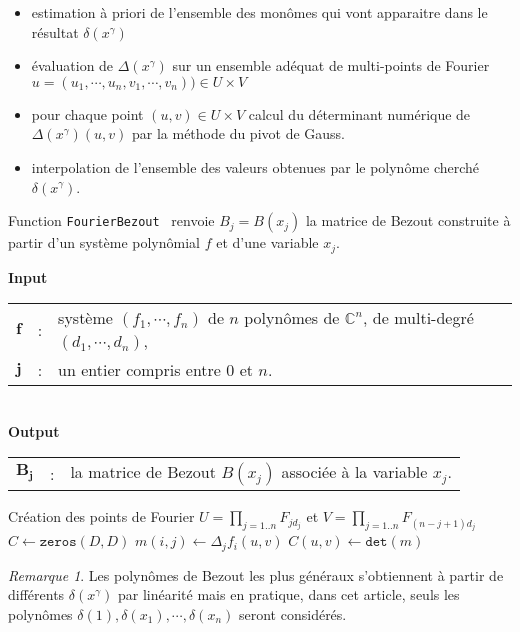 \documentclass{article}
\theoremstyle{plain}%
\theoremstyle{definition}
\theoremstyle{remark}
\newtheorem*{rem}{Remarque}
\newcommand{\vecb}[1]{\pmb{#1}}
\newcommand{\C}{\mathbb{C}}
\begin{document}
\begin{itemize}
\item estimation à priori de l'ensemble des monômes qui vont apparaitre dans le résultat $\delta(x^\gamma)$
\item évaluation de $\Delta(x^\gamma)$ sur un ensemble adéquat de multi-points de Fourier $u = (u_1,\cdots, u_n, v_1,\cdots, v_n) ) \in U\times V$
\item pour chaque point $(u, v) \in U\times V$ calcul du déterminant numérique de $\Delta(x^\gamma)(u, v)$ par la méthode du pivot de Gauss.
\item interpolation de l'ensemble des valeurs obtenues par le polynôme cherché $\delta(x^\gamma)$.
\end{itemize}

\begin{algorithm}[H]
\caption{Function \texttt{FourierBezout} \ renvoie $B_j = B(x_j)$  la matrice de Bezout construite à partir d'un système polynômial $f$ et d'une variable $x_j$.}\label{algo:01}
\textbf{Input\ }
  \begin{tabular}[t]{lcl}
    $\vecb{f}$  & : &  système $(f_1, \cdots, f_n)$ de $n$ polynômes de $\C^n$, de multi-degré $(d_1, \cdots, d_n)$,\\
     $\vecb{j}$ & : & un entier compris entre $0$ et $n$.
  \end{tabular}\\
\textbf{Output\ }
  \begin{tabular}[t]{lcl}
      $\vecb{B_j}$  & : & la matrice de Bezout $B(x_j)$ associée à la variable $x_j$.
  \end{tabular}
\begin{algorithmic}
	\State Création des points de Fourier $U = \prod_{j=1..n} F_{jd_j}$ et $V = \prod_{j=1..n} F_{(n-j+1)d_j}$
	\State $C \gets \texttt{zeros}(D, D)$
      		\State $m(i, j) \gets \Delta_j f_i(u, v)$
   		\EndFor
		\State $C(u, v) \gets \texttt{det}(m)$
	\EndFor
\EndFunction
\end{algorithmic}
\end{algorithm}

\begin{rem}
Les polynômes de Bezout les plus généraux s'obtiennent à partir de différents $\delta(x^\gamma)$ par linéarité mais en pratique, dans cet article, seuls les polynômes $\delta(1),\delta(x_1),\cdots,\delta(x_n)$ seront considérés.
\end{rem}
\end{document}
